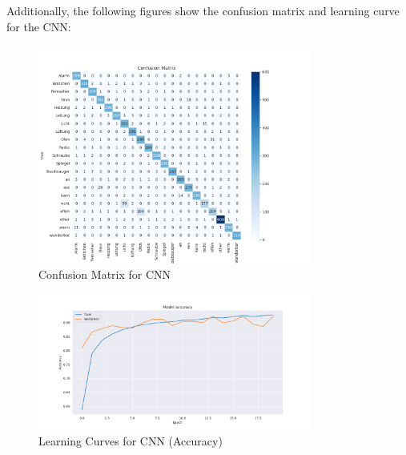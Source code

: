 Additionally, the following figures show the confusion matrix and learning curve for the CNN:
\begin{figure}[h!]
    \centering
    \includegraphics[width=0.8\textwidth]{fig/confusion_matrix.png}
    \caption{Confusion Matrix for CNN}
\end{figure}

\begin{figure}[h!]
    \centering
    \includegraphics[width=0.8\textwidth]{fig/learning_curves_accuracy.png}
    \caption{Learning Curves for CNN (Accuracy)}
\end{figure}
